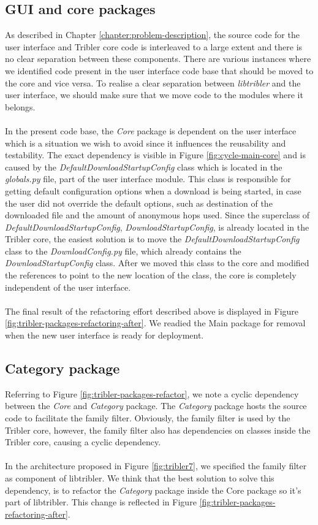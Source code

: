 \subsection{GUI and core packages}
\label{subsec:gui-core-packages}
As described in Chapter \ref{chapter:problem-description}, the source code for the user interface and Tribler core code is interleaved to a large extent and there is no clear separation between these components. There are various instances where we identified code present in the user interface code base that should be moved to the core and vice versa. To realise a clear separation between \emph{libtribler} and the user interface, we should make sure that we move code to the modules where it belongs.\\\\
In the present code base, the \emph{Core} package is dependent on the user interface which is a situation we wish to avoid since it influences the reusability and testability. The exact dependency is visible in Figure \ref{fig:cycle-main-core} and is caused by the \emph{DefaultDownloadStartupConfig} class which is located in the \emph{globals.py} file, part of the user interface module. This class is responsible for getting default configuration options when a download is being started, in case the user did not override the default options, such as destination of the downloaded file and the amount of anonymous hops used. Since the superclass of \emph{DefaultDownloadStartupConfig}, \emph{DownloadStartupConfig}, is already located in the Tribler core, the easiest solution is to move the \emph{DefaultDownloadStartupConfig} class to the \emph{DownloadConfig.py} file, which already contains the \emph{DownloadStartupConfig} class. After we moved this class to the core and modified the references to point to the new location of the class, the core is completely independent of the user interface.\\\\
The final result of the refactoring effort described above is displayed in Figure \ref{fig:tribler-packages-refactoring-after}. We readied the Main package for removal when the new user interface is ready for deployment.

\subsection{Category package}
Referring to Figure \ref{fig:tribler-packages-refactor}, we note a cyclic dependency between the \emph{Core} and \emph{Category} package. The \emph{Category} package hosts the source code to facilitate the family filter. Obviously, the family filter is used by the Tribler core, however, the family filter also has dependencies on classes inside the Tribler core, causing a cyclic dependency.\\\\
In the architecture proposed in Figure \ref{fig:tribler7}, we specified the family filter as component of libtribler. We think that the best solution to solve this dependency, is to refactor the \emph{Category} package inside the Core package so it's part of libtribler. This change is reflected in Figure \ref{fig:tribler-packages-refactoring-after}.

